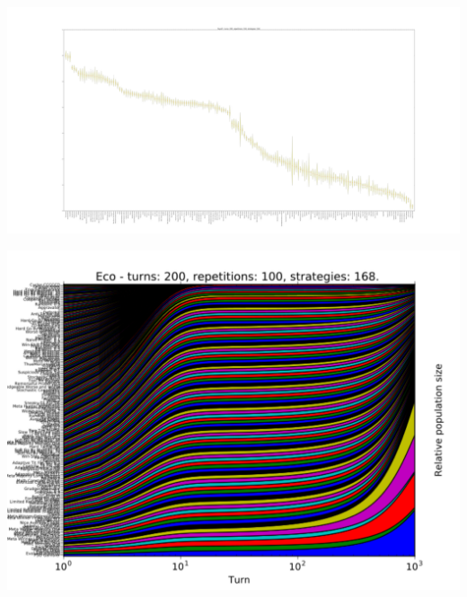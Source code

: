 \documentclass{beamer}
\begin{document}
\begin{frame}
    \begin{center}
        \includegraphics[width=\textwidth]{img/fulltournament.pdf}
    \end{center}
\end{frame}

\begin{frame}
    \begin{center}
        \includegraphics[width=\textwidth]{img/fullevo.pdf}
    \end{center}
\end{frame}
\end{document}
